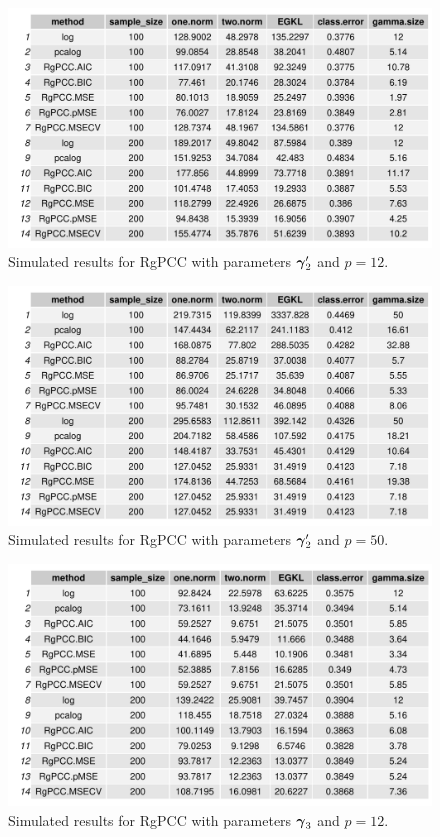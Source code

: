 \documentclass[main.tex]{subfiles}
\begin{document}
\begin{figure}[H]
	\centering
	\includegraphics[width =  \textwidth]{simulated/(sparsity3-nonlead,12)_metrics.pdf}
	\caption{Simulated results for RgPCC with parameters $\boldsymbol \gamma_2'$ and $p = 12$.}
	\label{fig:simulated3-12-nonlead}
\end{figure}

\begin{figure}[H]
	\centering
	\includegraphics[width =  \textwidth]{simulated/(sparsity3-nonlead,50)_metrics.pdf}
	\caption{Simulated results for RgPCC with parameters $\boldsymbol \gamma_2'$ and $p = 50$.}
	\label{fig:simulated3-50-nonlead}
\end{figure}

\begin{figure}[H]
	\centering
	\includegraphics[width =  \textwidth]{simulated/(sparsity5,12)_metrics.pdf}
	\caption{Simulated results for RgPCC with parameters $\boldsymbol \gamma_3$ and $p = 12$.}
	\label{fig:simulated5-12}
\end{figure}
\end{document}
